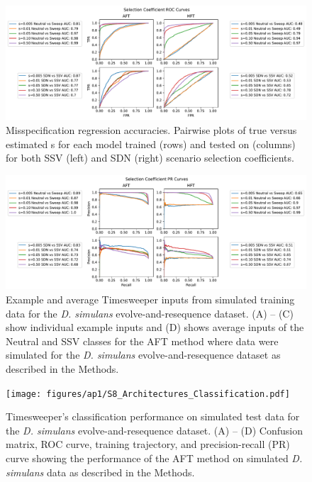 \begin{figure}
    \centering
    \includegraphics[width=\textwidth]{figures/ap1/S6_Sel_Coeff_ROC.pdf}
    \caption[Misspecification regression accuracies.]{Misspecification regression accuracies. Pairwise plots of true versus estimated s for each model trained (rows) and tested on (columns) for both SSV (left) and SDN (right) scenario selection coefficients.}
    \label{fig:S6_Sel_Coeff_ROC}
\end{figure}

\begin{figure}
    \centering
    \includegraphics[width=\textwidth]{figures/ap1/S7_Sel_Coeff_PR.pdf}
    \caption[Example and average Timesweeper inputs from simulated training data for the D.]{Example and average Timesweeper inputs from simulated training data for the \textit{D. simulans} evolve-and-resequence dataset. (A) – (C) show individual example inputs and (D) shows average inputs of the Neutral and SSV classes for the AFT method where data were simulated for the \textit{D. simulans} evolve-and-resequence dataset as described in the Methods.}
    \label{fig:S7_Sel_Coeff_PR}
\end{figure}

\begin{figure}
    \centering
    \texttt{[image: figures/ap1/S8\_Architectures\_Classification.pdf]}
    \caption[Timesweeper’s classification performance on simulated test data for the D.]{Timesweeper’s classification performance on simulated test data for the \textit{D. simulans} evolve-and-resequence dataset. (A) – (D) Confusion matrix, ROC curve, training trajectory, and precision-recall (PR) curve showing the performance of the AFT method on simulated \textit{D. simulans} data as described in the Methods.}
    \label{fig:S8_Architectures_Classification}
\end{figure}

